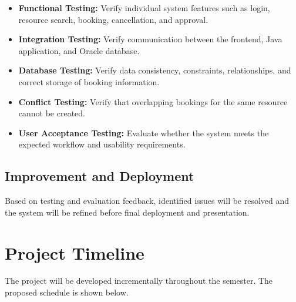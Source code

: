 \documentclass[12pt,a4paper]{article}
\begin{document}
\begin{itemize}
    \item \textbf{Functional Testing:} Verify individual system
    features such as login, resource search, booking, cancellation,
    and approval.

    \item \textbf{Integration Testing:} Verify communication between
    the frontend, Java application, and Oracle database.

    \item \textbf{Database Testing:} Verify data consistency,
    constraints, relationships, and correct storage of booking
    information.

    \item \textbf{Conflict Testing:} Verify that overlapping
    bookings for the same resource cannot be created.

    \item \textbf{User Acceptance Testing:} Evaluate whether the
    system meets the expected workflow and usability requirements.
\end{itemize}

\subsection{Improvement and Deployment}

Based on testing and evaluation feedback, identified issues will
be resolved and the system will be refined before final deployment
and presentation.

\section{Project Timeline}

The project will be developed incrementally throughout the semester.
The proposed schedule is shown below.
\end{document}
